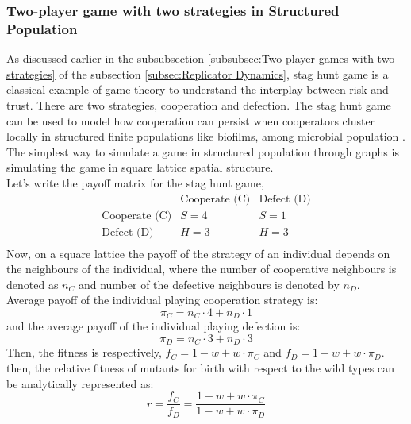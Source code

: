 \documentclass{article}
\begin{document}
\subsubsection{Two-player game with two strategies in Structured Population}
As discussed earlier in the subsubsection \ref{subsubsec:Two-player games with two strategies} of the subsection \ref{subsec:Replicator Dynamics}, stag hunt game is a classical example of game theory to understand the interplay between risk and trust. There are two strategies, cooperation and defection. The stag hunt game can be used to model how cooperation can persist when cooperators cluster locally in structured finite populations like biofilms, among microbial population \citep{Lambert2014}. 
The simplest way to simulate a game in structured population through graphs is simulating the game in square lattice spatial structure.\\
Let's write the payoff matrix for the stag hunt game,
\begin{equation}
\begin{array}{c|cc}
   & \text{Cooperate (C)} & \text{Defect (D)} \\
  \hline
  \text{Cooperate (C)} & S = 4 & S = 1 \\
  \text{Defect (D)} & H = 3 & H = 3 \\
\end{array} \label{eq:56}
\end{equation}
Now, on a square lattice the payoff of the strategy of an individual depends on the neighbours of the individual, where the number of cooperative neighbours is denoted as $n_C$ and number of the defective neighbours is denoted by $n_D$. \\
Average payoff of the individual playing cooperation strategy is:
\begin{equation}
\pi_C = n_C \cdot 4 + n_D \cdot 1 \label{eq:57}
\end{equation}
and the average payoff of the individual playing defection is:
\begin{equation}
\pi_D = n_C \cdot 3 + n_D \cdot 3 \label{eq:58}
\end{equation}
Then, the fitness is respectively, $f_C = 1 - w + w \cdot \pi_C$ and $f_D = 1 - w + w \cdot \pi_D$.
then, the relative fitness of mutants for birth with respect to the wild types can be analytically represented as:
\begin{equation}
r = \frac{f_C}{f_D} = \frac{1 - w + w \cdot \pi_C}{1 - w + w \cdot \pi_D} \label{eq:59}
\end{equation}
\end{document}
